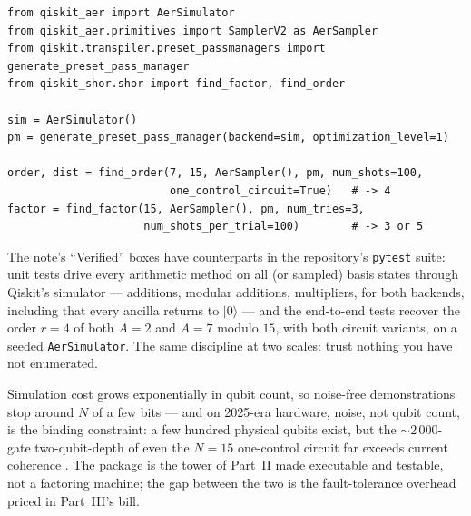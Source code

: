 \documentclass[11pt]{article}
\renewcommand{\ket}[1]{\lvert #1 \rangle}
\newcommand{\code}[1]{\texttt{#1}}
\theoremstyle{plain}
\theoremstyle{remark}
\begin{document}
\begin{lstlisting}
from qiskit_aer import AerSimulator
from qiskit_aer.primitives import SamplerV2 as AerSampler
from qiskit.transpiler.preset_passmanagers import generate_preset_pass_manager
from qiskit_shor.shor import find_factor, find_order

sim = AerSimulator()
pm = generate_preset_pass_manager(backend=sim, optimization_level=1)

order, dist = find_order(7, 15, AerSampler(), pm, num_shots=100,
                         one_control_circuit=True)   # -> 4
factor = find_factor(15, AerSampler(), pm, num_tries=3,
                     num_shots_per_trial=100)        # -> 3 or 5
\end{lstlisting}

\begin{keybox}[title={What the package machine-checks}]
The note's ``Verified'' boxes have counterparts in the repository's \code{pytest} suite: unit
tests drive every arithmetic method on all (or sampled) basis states through Qiskit's simulator ---
additions, modular additions, multipliers, for both backends, including that every ancilla returns
to $\ket0$ --- and the end-to-end tests recover the order $r=4$ of both $A=2$ and $A=7$ modulo
$15$, with both circuit variants, on a seeded \code{AerSimulator}. The same discipline at two
scales: trust nothing you have not enumerated.
\end{keybox}

\begin{warnbox}[title={What this does not demonstrate}]
Simulation cost grows exponentially in qubit count, so noise-free demonstrations stop around
$N$ of a few bits --- and on 2025-era hardware, noise, not qubit count, is the binding constraint:
a few hundred physical qubits exist, but the $\sim\!2\,000$-gate two-qubit-depth of even the
$N=15$ one-control circuit far exceeds current coherence \cite{repo}. The package is the tower of
Part~II made executable and testable, not a factoring machine; the gap between the two is the
fault-tolerance overhead priced in Part~III's bill.
\end{warnbox}
\end{document}
